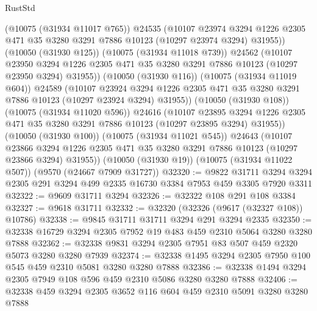 \begin{lexlean}{RustStd}
\begin{coremodule}
              (@10075 (@31934 @11017 @765))
              @24535
              (@10107
                @23974
                @3294
                @1226
                @2305
                @471
                @35
                @3280
                @3291
                @7886
                @10123
                (@10297 @23974 @3294)
                @31955))
            (@10050 (@31930 @125))
            (@10075 (@31934 @11018 @739))
            @24562
            (@10107
              @23950
              @3294
              @1226
              @2305
              @471
              @35
              @3280
              @3291
              @7886
              @10123
              (@10297 @23950 @3294)
              @31955))
          (@10050 (@31930 @116))
          (@10075 (@31934 @11019 @604))
          @24589
          (@10107
            @23924
            @3294
            @1226
            @2305
            @471
            @35
            @3280
            @3291
            @7886
            @10123
            (@10297 @23924 @3294)
            @31955))
        (@10050 (@31930 @108))
        (@10075 (@31934 @11020 @596))
        @24616
        (@10107
          @23895
          @3294
          @1226
          @2305
          @471
          @35
          @3280
          @3291
          @7886
          @10123
          (@10297 @23895 @3294)
          @31955))
      (@10050 (@31930 @100))
      (@10075 (@31934 @11021 @545))
      @24643
      (@10107
        @23866
        @3294
        @1226
        @2305
        @471
        @35
        @3280
        @3291
        @7886
        @10123
        (@10297 @23866 @3294)
        @31955))
    (@10050 (@31930 @19))
    (@10075 (@31934 @11022 @507))
    (@9570 (@24667 @7909 @31727))
@32320 := @9822
    @31711
    @3294
    @3294
    @2305
    @291
    @3294
    @499
    @2335
    @16730
    @3384
    @7953
    @459
    @3305
    @7920
    @3311
@32322 := @9609 @31711 @3294
@32326 := @32322 @108 @291 @108 @3384
@32327 := @9618 @31711
@32332 := @32320 (@32326 (@9617 (@32327 @108)) @10786)
@32338 := @9845 @31711 @31711 @3294 @291 @3294 @2335
@32350 := @32338 @16729 @3294 @2305 @7952 @19 @483 @459 @2310 @5064 @3280 @3280 @7888
@32362 := @32338 @9831 @3294 @2305 @7951 @83 @507 @459 @2320 @5073 @3280 @3280 @7939
@32374 := @32338 @1495 @3294 @2305 @7950 @100 @545 @459 @2310 @5081 @3280 @3280 @7888
@32386 := @32338 @1494 @3294 @2305 @7949 @108 @596 @459 @2310 @5086 @3280 @3280 @7888
@32406 := @32338
    @459
    @3294
    @2305
    @3652
    @116
    @604
    @459
    @2310
    @5091
    @3280
    @3280
    @7888

\end{coremodule}
\end{lexlean}
